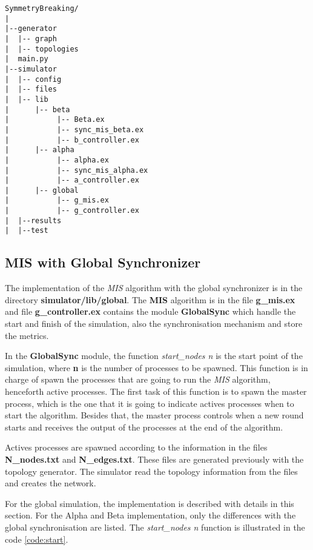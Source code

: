 \begin{verbatim}
SymmetryBreaking/
|
|--generator
|  |-- graph
|  |-- topologies
|  main.py
|--simulator
|  |-- config
|  |-- files
|  |-- lib
|      |-- beta
|           |-- Beta.ex
|           |-- sync_mis_beta.ex
|           |-- b_controller.ex
|      |-- alpha
|           |-- alpha.ex
|           |-- sync_mis_alpha.ex
|           |-- a_controller.ex
|      |-- global
|           |-- g_mis.ex
|           |-- g_controller.ex
|  |--results
|  |--test
\end{verbatim}

\subsection{MIS with Global Synchronizer}
 
The implementation of the \textit{MIS} algorithm with the global synchronizer is in the directory \textbf{simulator/lib/global}. The \textbf{MIS} algorithm is in the file \textbf{g\_mis.ex} and file \textbf{g\_controller.ex} contains the module \textbf{GlobalSync} which handle the start and finish of the simulation, also the synchronisation mechanism and store the metrics.

In the \textbf{GlobalSync} module, the function \textit{start\_nodes n} is the start point of the simulation, where \textbf{n} is the number of processes to be spawned. This function is in charge of spawn the processes that are going to run the \textit{MIS} algorithm, henceforth active processes. The first task of this function is to spawn the master process, which is the one that it is going to indicate actives processes when to start the algorithm.  Besides that, the master process controls when a new round starts and receives the output of the processes at the end of the algorithm.

Actives processes are spawned according to the information in the files  \textbf{N\_nodes.txt} and \textbf{N\_edges.txt}. These files are generated previously with the topology generator. The simulator read the topology information from the files and creates the network.  

For the global simulation, the implementation is described with details in this section. For the Alpha and Beta implementation, only the differences with the global synchronisation are listed. The  \textit{start\_nodes n} function is illustrated in the code \ref{code:start}.


